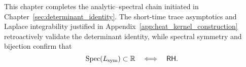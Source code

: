 \begin{remark}
\label{rem:logical_closure}
This chapter completes the analytic–spectral chain initiated in Chapter~\ref{sec:determinant_identity}. The short-time trace asymptotics and Laplace integrability justified in Appendix~\ref{app:heat_kernel_construction} retroactively validate the determinant identity, while spectral symmetry and bijection confirm that
\[
\operatorname{Spec}(L_{\mathrm{sym}}) \subset \mathbb{R} \quad \Longleftrightarrow \quad \mathsf{RH}.
\]
\end{remark}
